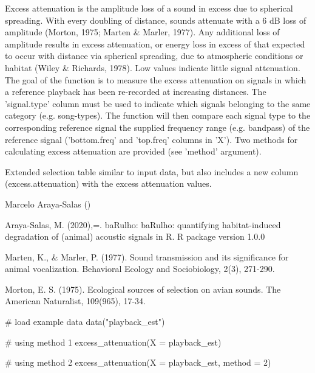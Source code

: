\documentclass[letterpaper]{book}
\begin{document}
%
\begin{Details}\relax
Excess attenuation is the amplitude loss of a sound in excess due to spherical spreading. With every doubling of distance, sounds attenuate with a 6 dB loss of amplitude (Morton, 1975; Marten \& Marler, 1977). Any additional loss of amplitude results in excess attenuation, or energy loss in excess of that expected to occur with distance via spherical spreading, due to atmospheric conditions or habitat (Wiley \& Richards, 1978). Low values indicate little signal attenuation. 
The goal of the function is to measure the excess attenuation on signals in which a reference playback has been re-recorded at increasing distances. The 'signal.type' column must be used to indicate which signals belonging to the same category (e.g. song-types). The function will then compare each signal type to the corresponding reference signal the supplied frequency range (e.g. bandpass) of the reference signal ('bottom.freq' and 'top.freq' columns in 'X'). Two methods for calculating excess attenuation are provided (see 'method' argument).
\end{Details}
%
\begin{Value}
Extended selection table similar to input data, but also includes a new column (excess.attenuation)
with the excess attenuation values.
\end{Value}
%
\begin{Author}\relax
Marcelo Araya-Salas ()
\end{Author}
%
\begin{References}\relax

Araya-Salas, M. (2020),=. baRulho: baRulho: quantifying habitat-induced degradation of (animal) acoustic signals in R. R package version 1.0.0

Marten, K., \& Marler, P. (1977). Sound transmission and its significance for animal vocalization. Behavioral Ecology and Sociobiology, 2(3), 271-290.

Morton, E. S. (1975). Ecological sources of selection on avian sounds. The American Naturalist, 109(965), 17-34.

\end{References}
%
\begin{SeeAlso}\relax
{}
\end{SeeAlso}
%
\begin{Examples}
\begin{ExampleCode}
{
# load example data
data("playback_est")

# using method 1
excess_attenuation(X = playback_est)

# using method 2
excess_attenuation(X = playback_est, method = 2)
}

\end{ExampleCode}
\end{Examples}
\end{document}
